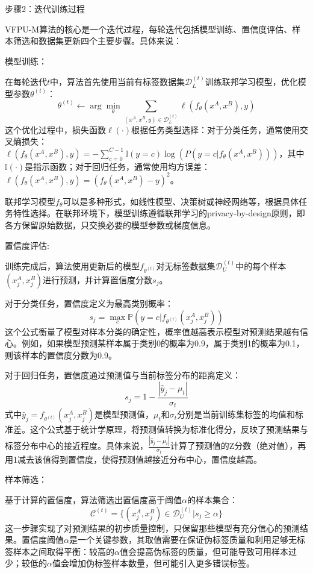 步骤2：迭代训练过程

VFPU-M算法的核心是一个迭代过程，每轮迭代包括模型训练、置信度评估、样本筛选和数据集更新四个主要步骤。具体来说：

模型训练：

在每轮迭代$t$中，算法首先使用当前有标签数据集$\mathcal{D}_L^{(t)}$训练联邦学习模型，优化模型参数$\theta^{(t)}$：
\begin{equation}
	\theta^{(t)} \leftarrow \arg\min_\theta \sum_{(x^A,x^B,y)\in\mathcal{D}_L^{(t)}} \ell(f_\theta(x^A,x^B), y)
\end{equation}
这个优化过程中，损失函数$\ell(\cdot)$根据任务类型选择：对于分类任务，通常使用交叉熵损失：$\ell(f_\theta(x^A,x^B), y) = -\sum_{c=0}^{C-1} \mathbb{I}(y=c) \log(P(y=c|f_\theta(x^A,x^B)))$，其中$\mathbb{I}(\cdot)$是指示函数；对于回归任务，通常使用均方误差：$\ell(f_\theta(x^A,x^B), y) = (f_\theta(x^A,x^B) - y)^2$。


联邦学习模型$f_\theta$可以是多种形式，如线性模型、决策树或神经网络等，根据具体任务特性选择。在联邦环境下，模型训练遵循联邦学习的privacy-by-design原则，即各方保留原始数据，只交换必要的模型参数或梯度信息。

置信度评估:

训练完成后，算法使用更新后的模型$f_{\theta^{(t)}}$对无标签数据集$\mathcal{D}_U^{(t)}$中的每个样本$(x^A_j,x^B_j)$进行预测，并计算置信度分数$s_j$。

对于分类任务，置信度定义为最高类别概率：
\begin{equation}
	s_j = \max_{c} \mathbb{P}(y=c|f_{\theta^{(t)}}(x^A_j,x^B_j))
\end{equation}
这个公式衡量了模型对样本分类的确定性，概率值越高表示模型对预测结果越有信心。例如，如果模型预测某样本属于类别0的概率为0.9，属于类别1的概率为0.1，则该样本的置信度分数为0.9。

对于回归任务，置信度通过预测值与当前标签分布的距离定义：
\begin{equation}
	s_j = 1 - \frac{|\hat{y}_j - \mu_t|}{\sigma_t}
\end{equation}
式中$\hat{y}_j = f_{\theta^{(t)}}(x^A_j,x^B_j)$是模型预测值，$\mu_t$和$\sigma_t$分别是当前训练集标签的均值和标准差。这个公式基于统计学原理，将预测值转换为标准化得分，反映了预测结果与标签分布中心的接近程度。具体来说，$\frac{|\hat{y}_j - \mu_t|}{\sigma_t}$计算了预测值的Z分数（绝对值），再用1减去该值得到置信度，使得预测值越接近分布中心，置信度越高。

样本筛选：

基于计算的置信度，算法筛选出置信度高于阈值$\alpha$的样本集合：
\begin{equation}
	\mathcal{C}^{(t)} = \{(x^A_j,x^B_j) \in \mathcal{D}_U^{(t)} | s_j \geq \alpha\}
\end{equation}
这一步骤实现了对预测结果的初步质量控制，只保留那些模型有充分信心的预测结果。置信度阈值$\alpha$是一个关键参数，其取值需要在保证伪标签质量和利用足够无标签样本之间取得平衡：较高的$\alpha$值会提高伪标签的质量，但可能导致可用样本过少；较低的$\alpha$值会增加伪标签样本数量，但可能引入更多错误标签。

